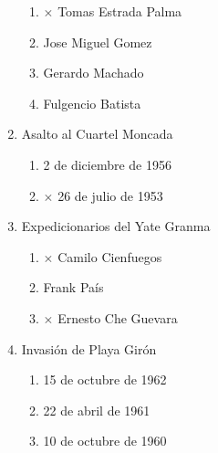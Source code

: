 \documentclass[twocolumn]{article}
\begin{document}
\begin{enumerate}
  \begin{enumerate}
   
   \item $\times$ Tomas Estrada Palma
   
   \item  Jose Miguel Gomez
   
   \item  Gerardo Machado
   
   \item  Fulgencio Batista
   
  \end{enumerate}



  \item Asalto al Cuartel Moncada

  \begin{enumerate}
   
   \item  2 de diciembre de 1956
   
   \item $\times$ 26 de julio de 1953
   
  \end{enumerate}



  \item Expedicionarios del Yate Granma

  \begin{enumerate}
   
   \item $\times$ Camilo Cienfuegos
   
   \item  Frank País
   
   \item $\times$ Ernesto Che Guevara
   
  \end{enumerate}



  \item Invasión de Playa Girón

  \begin{enumerate}
   
   \item  15 de octubre de 1962
   
   \item  22 de abril de 1961
   
   \item  10 de octubre de 1960
   
  \end{enumerate}


\end{enumerate}


\end{document}
